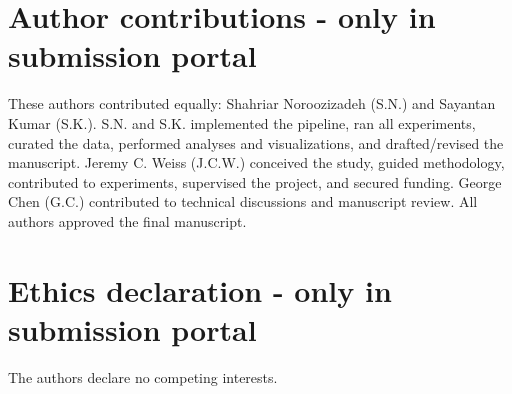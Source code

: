 \documentclass[pdflatex,sn-mathphys-num]{sn-jnl}%
\theoremstyle{thmstyleone}%
\theoremstyle{thmstyletwo}%
\theoremstyle{thmstylethree}%
\begin{document}
\section*{Author contributions - only in submission portal}

These authors contributed equally: Shahriar Noroozizadeh (S.N.) and Sayantan Kumar (S.K.).
S.N. and S.K. implemented the pipeline, ran all experiments, curated the data, performed analyses and visualizations, and drafted/revised the manuscript. Jeremy C. Weiss (J.C.W.) conceived the study, guided methodology, contributed to experiments, supervised the project, and secured funding. George Chen (G.C.) contributed to technical discussions and manuscript review. All authors approved the final manuscript.


\section*{Ethics declaration - only in submission portal}
The authors declare no competing interests.

\end{document}
